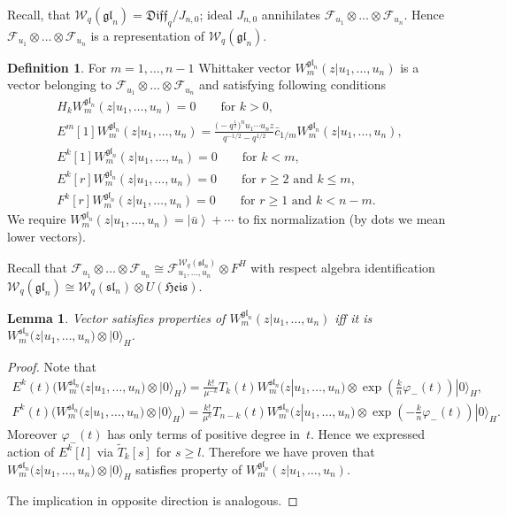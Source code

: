 \documentclass[pdftex]{sigma}
\numberwithin{equation}{section}
\newtheorem{Lemma}[Theorem]{Lemma}
\theoremstyle{definition}
\newtheorem{Definition}[Theorem]{Definition}
\newcommand{\half}{\frac{1}{2}}
\newcommand{\vac}{|0 \rangle}
\newcommand{\qD}{\mathfrak{Diff}_q}
\newcommand{\T}{\tilde{T}}
\newcommand{ \W }{ \mathcal{W}_{q} ( \mathfrak{sl}_n ) }
\newcommand{ \Wgl }{ \mathcal{W}_{q} ( \mathfrak{gl}_n ) }
\newcommand{\vacF}{ \left| \bar{u} \right\rangle}
\newcommand{\UH}{\otimes U(\mathfrak{Heis})}
\begin{document}
Recall, that $\Wgl = \qD / J_{n,0}$; ideal $J_{n,0}$ annihilates $\mathcal{F}_{u_1} \otimes \dots \otimes \mathcal{F}_{u_n}$. Hence $\mathcal{F}_{u_1} \otimes \dots \otimes \mathcal{F}_{u_n}$ is a representation of $\Wgl$.
\begin{Definition}
For $m=1, \dots, n-1$ Whittaker vector $W_m^{\mathfrak{gl}_n}(z| u_1, \dots, u_n)$ is a vector belonging to $\mathcal{F}_{u_1} \otimes \dots \otimes \mathcal{F}_{u_n}$ and satisfying following conditions
\begin{gather*}
H_k W_m^{\mathfrak{gl}_n}(z| u_1, \dots, u_n) = 0 \qquad \text{for $k > 0$},\\
E^{m}[1] W_m^{\mathfrak{gl}_n}(z| u_1, \dots, u_n) = \frac{\big({-}q^{\half} \big)^nu_1 \cdots u_n z}{q^{-1/2}-q^{1/2}} \bar{c}_{1/m} W_m^{\mathfrak{gl}_n}(z| u_1, \dots, u_n),\\
E^{k}[1] W_m^{\mathfrak{gl}_n}(z| u_1, \dots, u_n) =0 \qquad \text{for $k < m$},\\
E^{k}[r] W_m^{\mathfrak{gl}_n}(z| u_1, \dots, u_n) =0 \qquad \text{for $r \geqslant 2$ and $k \leqslant m$}, \\
F^k[r] W_m^{\mathfrak{gl}_n}(z| u_1, \dots, u_n) =0 \qquad \text{for $r \geqslant 1$ and $k < n-m$}.
\end{gather*}
We require $W_m^{\mathfrak{gl}_n}(z| u_1, \dots, u_n) = \vacF + \cdots$ to fix normalization (by dots we mean lower vectors).
\end{Definition}

Recall that $\mathcal{F}_{u_1} \otimes \dots \otimes \mathcal{F}_{u_n} \cong \mathcal{F}_{u_1, \dots, u_n}^{\W} \otimes F^{H}$ with respect algebra identification $\Wgl \cong \W \UH$.

\begin{Lemma} \label{prop: Lemma sl vs gl}
Vector satisfies properties of $W_m^{\mathfrak{gl}_n}(z| u_1, \dots, u_n)$ iff it is $W_m^{\mathfrak{sl}_n}(z| u_1, \dots, u_n) \otimes \vac_H$.
\end{Lemma}

\begin{proof}Note that
\begin{gather*}
E^k (t) \big( W_m^{\mathfrak{sl}_n}(z| u_1, \dots, u_n) \otimes \vac_H \big) = \frac{k!}{\mu^{-k}} T_k (t)   W_m^{\mathfrak{sl}_n}(z| u_1, \dots, u_n) \otimes \exp \left(\frac{k}{n} \varphi_- (t) \right)\! \vac_H,\\
F^k (t) \big( W_m^{\mathfrak{sl}_n}(z| u_1, \dots, u_n) \otimes \vac_H \big)  = \frac{k!}{\mu^{k}} T_{n-k} (t)   W_m^{\mathfrak{sl}_n}(z| u_1, \dots, u_n) \otimes \exp \left(-\frac{k}{n} \varphi_- (t) \right) \!\vac_H.
\end{gather*}
Moreover $\varphi_-(t)$ has only terms of positive degree in~$t$. Hence we expressed action of $E^k[l]$ via $\T_k[s]$ for $s \geqslant l$. Therefore we have proven that $W_m^{\mathfrak{sl}_n}(z| u_1, \dots, u_n) \otimes \vac_H$ satisfies property of $W_m^{\mathfrak{gl}_n}(z| u_1, \dots, u_n)$.

The implication in opposite direction is analogous.
\end{proof}
\end{document}

